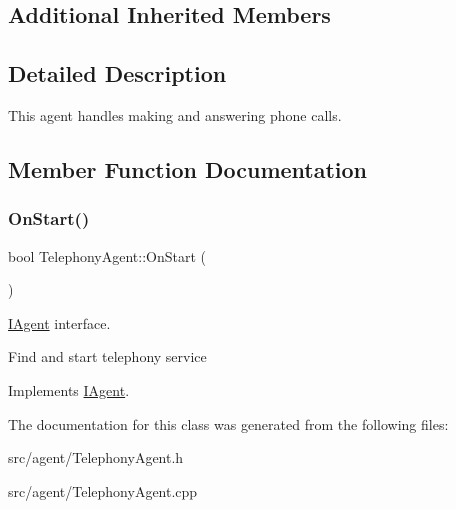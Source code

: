 \subsection*{Additional Inherited Members}


\subsection{Detailed Description}
This agent handles making and answering phone calls. 

\subsection{Member Function Documentation}
\mbox{\label{class_telephony_agent_a65529f3187ba02917a868595599ad0c2}} 
\subsubsection{\texorpdfstring{On\+Start()}{OnStart()}}
{\footnotesize\ttfamily bool Telephony\+Agent\+::\+On\+Start (\begin{DoxyParamCaption}{ }\end{DoxyParamCaption})\hspace{0.3cm}{\ttfamily [virtual]}}



\hyperlink{class_i_agent}{I\+Agent} interface. 

Find and start telephony service 

Implements \hyperlink{class_i_agent_a176389a45e19affdd1b8be5c6c981120}{I\+Agent}.



The documentation for this class was generated from the following files\+:\begin{DoxyCompactItemize}
\item 
src/agent/Telephony\+Agent.\+h\item 
src/agent/Telephony\+Agent.\+cpp\end{DoxyCompactItemize}
